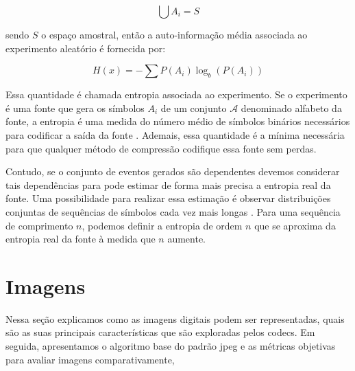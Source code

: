 \begin{equation}
\bigcup A_i = S 
\end{equation}

sendo $S$ o espaço amostral, então a auto-informação média associada ao experimento aleatório é fornecida por:

\begin{equation}
H(x) = -\sum P(A_i)\log_b(P(A_i))
\end{equation}

Essa quantidade é chamada entropia associada ao	experimento. Se o experimento é uma fonte que gera os símbolos $A_i$ de um conjunto $\mathcal{A}$ denominado alfabeto da fonte, a entropia é uma medida do número médio de símbolos binários necessários para codificar a saída da fonte  \cite{sayood2017introduction}. Ademais, essa quantidade é a mínima necessária para que qualquer método de compressão codifique essa fonte sem perdas.

Contudo, se o conjunto de eventos gerados são dependentes devemos considerar tais dependências para pode estimar de forma mais precisa a entropia real da fonte. 
Uma possibilidade para realizar essa estimação é observar distribuições conjuntas de sequências de símbolos cada vez mais longas \cite{sayood2017introduction}. Para uma sequência de comprimento $n$, podemos definir a entropia de ordem $n$ que se aproxima da entropia real da fonte à medida que $n$ aumente. 




\section{Imagens}
Nessa seção explicamos como as imagens digitais podem ser representadas, quais são as suas principais características que são exploradas pelos \acrshort{codec}s. Em seguida, apresentamos o algoritmo base do padrão \acrshort{jpeg} e as métricas objetivas para avaliar imagens comparativamente,

